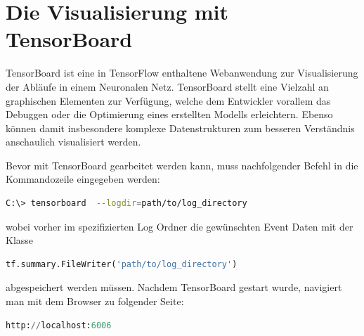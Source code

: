 \section{Die Visualisierung mit TensorBoard}

TensorBoard ist eine in TensorFlow enthaltene Webanwendung zur Visualisierung der Abläufe in einem Neuronalen Netz. TensorBoard stellt eine Vielzahl an graphischen Elementen zur Verfügung, welche dem Entwickler vorallem das Debuggen oder die Optimierung eines erstellten Modells erleichtern. Ebenso können damit insbesondere komplexe Datenstrukturen zum besseren Verständnis anschaulich visualisiert werden. 

Bevor mit TensorBoard gearbeitet werden kann, muss nachfolgender Befehl in die Kommandozeile eingegeben werden:
\\

\begin{minipage}{\linewidth}
\begin{lstlisting}[language=bash, label={lst:tensorboard}]
C:\> tensorboard  --logdir=path/to/log_directory

\end{lstlisting}
\end{minipage}

\vspace{0.2cm}
wobei vorher im spezifizierten Log Ordner die gewünschten Event Daten mit der Klasse
\\

\begin{minipage}{\linewidth}
\begin{lstlisting}[language=Python, label={lst:FileWriter}]
tf.summary.FileWriter('path/to/log_directory')

\end{lstlisting}
\end{minipage}
\vspace{0.2cm}

abgespeichert werden müssen. Nachdem TensorBoard gestart wurde, navigiert man mit dem Browser zu folgender Seite:
\\

\begin{minipage}{\linewidth}
\begin{lstlisting}[language=Python, label={lst:localhost}]
http://localhost:6006

\end{lstlisting}
\end{minipage}
\vspace{0.2cm}

